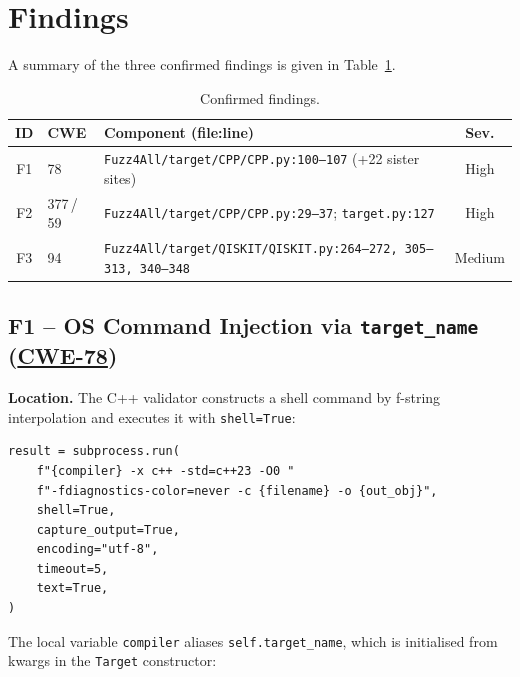 \documentclass[conference]{IEEEtran}
\newcommand{\cwe}[1]{\href{https://cwe.mitre.org/data/definitions/#1.html}{CWE-#1}}
\begin{document}
\section{Findings}
\label{sec:findings}

A summary of the three confirmed findings is given in
Table~\ref{tab:findings}.

\begin{table}[t]
\caption{Confirmed findings.}
\label{tab:findings}
\centering\renewcommand{\arraystretch}{1.15}
\begin{tabularx}{\columnwidth}{clXc}
\toprule
\textbf{ID} & \textbf{CWE} & \textbf{Component (file:line)} & \textbf{Sev.} \\
\midrule
F1 & 78  & \texttt{Fuzz4All/target/CPP/CPP.py:100--107} (+22 sister sites) & High \\
F2 & 377\,/\,59 & \texttt{Fuzz4All/target/CPP/CPP.py:29--37}; \texttt{target.py:127} & High \\
F3 & 94  & \texttt{Fuzz4All/target/QISKIT/QISKIT.py:264--272, 305--313, 340--348} & Medium \\
\bottomrule
\end{tabularx}
\end{table}

\subsection{F1 -- OS Command Injection via \texttt{target\_name} (\cwe{78})}

\textbf{Location.} The C++ validator constructs a shell command by
f-string interpolation and executes it with \texttt{shell=True}:

\begin{lstlisting}[style=py,caption={Vulnerable validator in Fuzz4All/target/CPP/CPP.py (lines 100--107).},firstnumber=100,label={lst:f1}]
result = subprocess.run(
    f"{compiler} -x c++ -std=c++23 -O0 "
    f"-fdiagnostics-color=never -c {filename} -o {out_obj}",
    shell=True,
    capture_output=True,
    encoding="utf-8",
    timeout=5,
    text=True,
)
\end{lstlisting}

The local variable \texttt{compiler} aliases \texttt{self.target\_name},
which is initialised from kwargs in the \texttt{Target} constructor:
\end{document}
